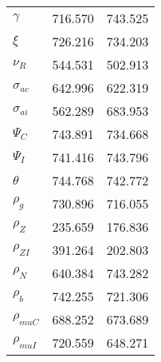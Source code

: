 \begin{center}
\begin{longtable}{lcc}
$ \gamma                  $	 & 	     716.570	 & 	     743.525 \\ 
$ \xi                     $	 & 	     726.216	 & 	     734.203 \\ 
$ {\nu_R}                 $	 & 	     544.531	 & 	     502.913 \\ 
$ {\sigma_{ac}}           $	 & 	     642.996	 & 	     622.319 \\ 
$ {\sigma_{ai}}           $	 & 	     562.289	 & 	     683.953 \\ 
$ {\Psi_{C}}              $	 & 	     743.891	 & 	     734.668 \\ 
$ {\Psi_I}                $	 & 	     741.416	 & 	     743.796 \\ 
$ {\theta}                $	 & 	     744.768	 & 	     742.772 \\ 
$ {\rho_g}                $	 & 	     730.896	 & 	     716.055 \\ 
$ {\rho_Z}                $	 & 	     235.659	 & 	     176.836 \\ 
$ {\rho_{ZI}}             $	 & 	     391.264	 & 	     202.803 \\ 
$ {\rho_N}                $	 & 	     640.384	 & 	     743.282 \\ 
$ {\rho_b}                $	 & 	     742.255	 & 	     721.306 \\ 
$ {\rho_{muC}}            $	 & 	     688.252	 & 	     673.689 \\ 
$ {\rho_{muI}}            $	 & 	     720.559	 & 	     648.271 \\ 
\end{longtable}
 \end{center}
